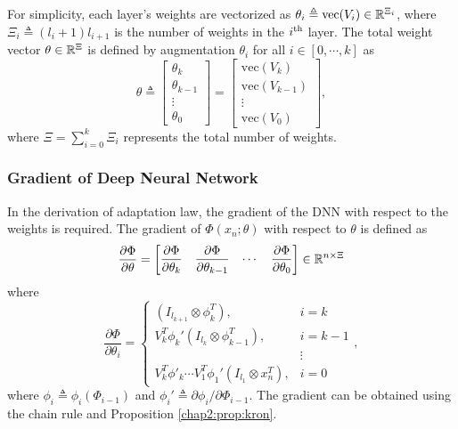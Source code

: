 For simplicity, each layer's weights are vectorized as $\theta_i\triangleq\text{vec}(V_i)\in\mathbb{R}^{\Xi_i}$, where $\Xi_i\triangleq (l_i+1)l_{i+1}$ is the number of weights in the $i\textsuperscript{th}$ layer. 
The total weight vector $\theta\in\mathbb{R}^{\Xi}$ is defined by augmentation $\theta_i$ for all $i\in \left[0,\cdots,k\right]$ as 
\begin{equation}
    \theta \triangleq 
    \begin{bmatrix}
        \theta_k\\
        \theta_{k-1}\\
        \vdots\\
        \theta_0
    \end{bmatrix}
    =
    \begin{bmatrix}
        \text{vec}(V_k)\\
        \text{vec}(V_{k-1})\\
        \vdots\\
        \text{vec}(V_0)
    \end{bmatrix},
\end{equation}
where $\Xi={\sum_{i=0}^{k} \Xi_i}$ represents the total number of weights. 

\subsubsection{Gradient of Deep Neural Network} \label{chap2:sec:DNNgrad}

In the derivation of adaptation law, the gradient of the DNN with respect to the weights is required.
The gradient of $ \Phi(x_n;\theta)$ with respect to $\theta$ is defined as
\begin{equation}
    {\partial\Phi\over\partial \theta}=
    \begin{bmatrix}
        \dfrac{\partial \Phi}{\partial \theta_k}&
        \dfrac{\partial \Phi}{\partial \theta_{k-1}}&
    \cdots &
        \dfrac{\partial \Phi}{\partial \theta_0}
    \end{bmatrix}
    \in\mathbb{R}^{n \times \Xi}
    \label{chap2:eq:DNNgrad}
\end{equation}
where
\begin{equation}
    \frac{\partial \Phi}{\partial \theta_i} = 
    \begin{cases}
        (I_{l_{k+1}}\otimes \phi_{k}^T  ), & i=k \\
        V_k^T   \phi_{k}' (I_{l_{k}}\otimes  \phi_{k-1}^T  ), & i=k-1\\
        &\vdots \\
        V_k^T   \phi'_{k} \cdots V_1^T  \phi_1' (I_{l_1}\otimes x_n^T  ), & i = 0
    \end{cases},
\end{equation}
where $\phi_i\triangleq \phi_i(\Phi_{i-1})$ and $\phi_i'\triangleq \partial \phi_i/\partial \Phi_{i-1}$.
The gradient can be obtained using the chain rule and Proposition \ref{chap2:prop:kron}.

